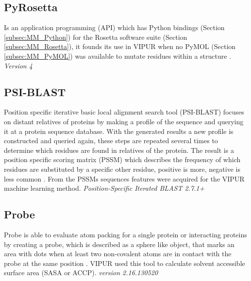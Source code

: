 \subsection{PyRosetta}
Is an application programming (API) which has Python bindings (Section \ref{subsec:MM_Python}) for the Rosetta software suite (Section \ref{subsec:MM_Rosetta}), it founds its use in VIPUR when no PyMOL (Section \ref{subsec:MM_PyMOL}) was available to mutate residues within a structure \cite{}.
\label{subsec:MM_PyRosetta}
\newline
\textit{Version 4}

\subsection{PSI-BLAST}
Position specific iterative basic local alignment search tool (PSI-BLAST) focuses on distant relatives of proteins by making a profile of the sequence and querying it at a protein sequence database. With the generated results a new profile is constructed and queried again, these steps are repeated several times to determine which residues are found in relatives of the protein. The result is a position specific scoring matrix (PSSM) which describes the frequency of which residues are substituted by a specific other residue, positive is more, negative is less common \cite{}.
From the PSSMs sequences features were acquired for the VIPUR machine learning method.
\label{subsec:MM_PSI_BLAST}
\newline
\textit{Position-Specific Iterated BLAST 2.7.1+}

\subsection{Probe}
Probe is able to evaluate atom packing for a single protein or interacting proteins by creating a probe, which is described as a sphere like object, that marks an area with dots when at least two non-covalent atoms are in contact with the probe at the same position \cite{}. VIPUR used this tool to calculate solvent accessible surface area (SASA or ACCP).
\label{subsec:MM_Probe}
\newline
\textit{version 2.16.130520}

